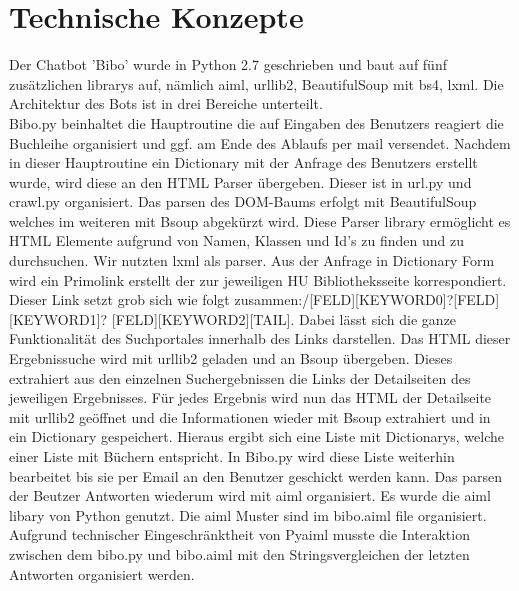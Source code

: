 \documentclass[12pt,a4paper]{scrartcl}
\begin{document}
\section{Technische Konzepte}
Der Chatbot 'Bibo' wurde in Python 2.7 geschrieben und baut auf fünf zusätzlichen librarys auf, nämlich aiml, urllib2, BeautifulSoup mit bs4, lxml.                                                Die Architektur des Bots ist in drei Bereiche unterteilt.\\ Bibo.py beinhaltet die Hauptroutine die auf Eingaben des Benutzers reagiert die Buchleihe organisiert und ggf. am Ende des Ablaufs per mail versendet. Nachdem in dieser Hauptroutine ein Dictionary mit der Anfrage des Benutzers erstellt wurde, wird diese an den HTML Parser übergeben.\newline
Dieser ist in url.py und crawl.py               
organisiert. Das parsen des DOM-Baums erfolgt mit BeautifulSoup welches im weiteren mit Bsoup abgekürzt wird. Diese Parser library                                                           
ermöglicht es HTML Elemente aufgrund von Namen, Klassen und Id's zu finden und zu durchsuchen. Wir nutzten lxml als parser. Aus der Anfrage in Dictionary Form wird ein Primolink erstellt der zur                                                                     
jeweiligen HU Bibliotheksseite korrespondiert. Dieser Link setzt grob sich wie folgt zusammen:\newline
[BASEURL]/[FELD][KEYWORD0]?[FELD][KEYWORD1]? [FELD][KEYWORD2][TAIL]. Dabei lässt sich die ganze Funktionalität des Suchportales innerhalb des Links darstellen.   
Das HTML dieser Ergebnissuche wird mit urllib2 geladen und an Bsoup übergeben. Dieses extrahiert aus den einzelnen Suchergebnissen die Links der Detailseiten des jeweiligen         
Ergebnisses. Für jedes Ergebnis wird nun das HTML der Detailseite mit urllib2 geöffnet und die Informationen wieder mit Bsoup extrahiert und in ein Dictionary gespeichert. Hieraus ergibt sich eine Liste mit Dictionarys, welche einer Liste mit Büchern entspricht. In Bibo.py wird diese Liste weiterhin bearbeitet bis sie per Email an den Benutzer geschickt        
werden kann.\newline
Das parsen der Beutzer Antworten wiederum wird mit aiml organisiert. Es wurde die aiml libary     
von Python genutzt. Die aiml Muster sind im bibo.aiml file organisiert. Aufgrund technischer Eingeschränktheit von Pyaiml musste die Interaktion zwischen dem bibo.py und bibo.aiml mit den Stringsvergleichen der letzten Antworten organisiert werden.\newline
\end{document}
